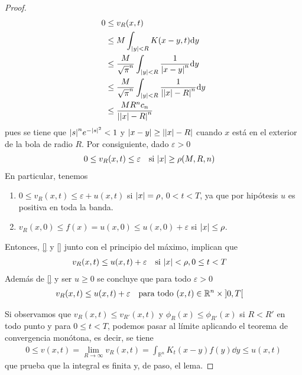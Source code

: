 \documentclass{article}
\newcommand{\realNumbers}{\mathbb{R}}
\theoremstyle{definition}
\theoremstyle{remark}
\newcommand{\leftOpenInterval}{\left]}
\newcommand{\rightOpenInterval}{\right[}
\newcommand{\leftClosedInterval}{\left[}
\newcommand{\rightClosedInterval}{\right]}
\newcommand{\interval}[3]{%
  \ifstrequal{#1}{oo}{%
    \leftOpenInterval #2, #3 \rightOpenInterval%
  }{%
    \ifstrequal{#1}{co}{%
      \leftClosedInterval #2, #3 \rightOpenInterval%
    }{%
      \ifstrequal{#1}{oc}{
        \leftOpenInterval #2, #3 \rightClosedInterval%
      }{%
        \ifstrequal{#1}{cc}{
          \leftClosedInterval #2, #3 \rightClosedInterval
        }{%
        }%
      }%
    }%
  }%
}
\begin{document}
\begin{proof}
    \begin{align}
      0
      &\leq
      v_R(x, t)
      \\
      &\leq
      M \int_{\abs{y} < R} K(x - y, t) \dd y
      \\
      &\leq
      \frac{M}{\sqrt{\pi}^n} \int_{\abs{y} < R} \frac{1}{\abs{x - y}^n} \dd y
      \\
      &\leq
      \frac{M}{\sqrt{\pi}^n} \int_{\abs{y} < R} \frac{1}{\abs{\abs{x} - R}^n} \dd y
      \\
      &\leq
      \frac{M R^n c_n}{\abs{\abs{x} - R}^n}
    \end{align}
    pues se tiene que \(\abs{s}^n e^{- \abs{s}^2} < 1\) y \(\abs{x - y} \geq \abs{\abs{x} - R}\) cuando \(x\) está en el exterior de la bola de radio \(R\).
    Por consiguiente, dado \(\varepsilon > 0\)
    \begin{align}
      & 0 \leq v_R(x, t) \leq \varepsilon
      && \text{si } \abs{x} \geq \rho(M, R, n)
    \end{align}
    En particular, tenemos
    \begin{enumerate}
      \item \(0 \leq v_R(x, t) \leq \varepsilon + u(x, t)\) si \(\abs{x} = \rho\), \(0 < t < T\), ya que por hipótesis \(u\) es positiva en toda la banda.
      \item \(v_R(x, 0) \leq f(x) = u(x, 0) \leq u(x, 0) + \varepsilon\) si \(\abs{x} \leq \rho\).
    \end{enumerate}
    Entonces, \ref{} %
    y \ref{} %
    junto con el principio del máximo, implican que
    \begin{align}
      & v_R(x, t) \leq u(x, t) + \varepsilon
      && \text{si } \abs{x} < \rho, 0 \leq t < T
    \end{align}
    Además de \ref{}  %
    y ser \(u \geq 0\) se concluye que para todo \(\varepsilon > 0\)
    \begin{align}
      &v_R(x, t) \leq u(x, t) + \varepsilon
      && \text{para todo } (x, t) \in \realNumbers^n \times \interval{oo}{0}{T}
    \end{align}
    
    Si observamos que \(v_R(x, t) \leq v_{R'}(x, t)\) y \(\phi_R(x) \leq \phi_{R'}(x)\) si \(R < R'\) en todo punto y para \(0 \leq t < T\), podemos pasar al límite aplicando el teorema de convergencia monótona, es decir, se tiene
    \begin{align}
      0
      \leq
      v(x, t)
      =
      \lim_{R \rightarrow \infty} v_R(x, t)
      =
      \int_{\realNumbers^n} K_t(x - y) f(y) \dd y
      \leq
      u(x, t)
    \end{align}
    que prueba que la integral es finita y, de paso, el lema.
  \end{proof}
\end{document}
